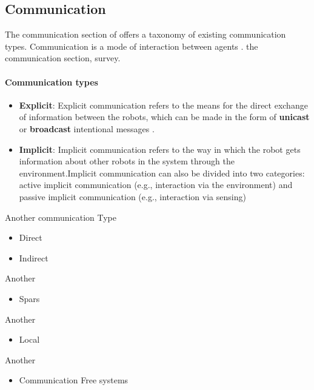 \documentclass{article}
\begin{document}
		\subsection{Communication}
			The communication section of \citet{yan-2013-a-survey-and-analysis-of-multi-robot-coordination} offers a taxonomy of existing communication types. Communication is a mode of interaction between agents \citep{yan-2013-a-survey-and-analysis-of-multi-robot-coordination}.
			\citet{arai-2002-guest-editorial-advances-in-multirobot-systems} the communication section, survey.
			\paragraph{Communication types}
			\begin{itemize}
				\item \textbf{Explicit}: Explicit communication refers to the means for the direct exchange of information between the robots, which can be made in the form of \textbf{unicast} or \textbf{broadcast} intentional messages \cite{yan-2013-a-survey-and-analysis-of-multi-robot-coordination}.
				
				\item \textbf{Implicit}: Implicit communication refers to the way in which the
				robot gets information about other robots in the system through the  environment.Implicit communication can also be divided into two 			categories: active implicit communication (e.g., interaction via the environment) and passive implicit communication (e.g., interaction via sensing) \cite{yan-2013-a-survey-and-analysis-of-multi-robot-coordination}
			\end{itemize}
			Another communication Type
			\begin{itemize}
				\item Direct
				\item Indirect
			\end{itemize}
			Another
			\begin{itemize}
				\item Spars
			\end{itemize}
			Another
			\begin{itemize}
				\item Local
			\end{itemize}
			Another
			\begin{itemize}
				\item Communication Free systems
			\end{itemize}
			
\end{document}
